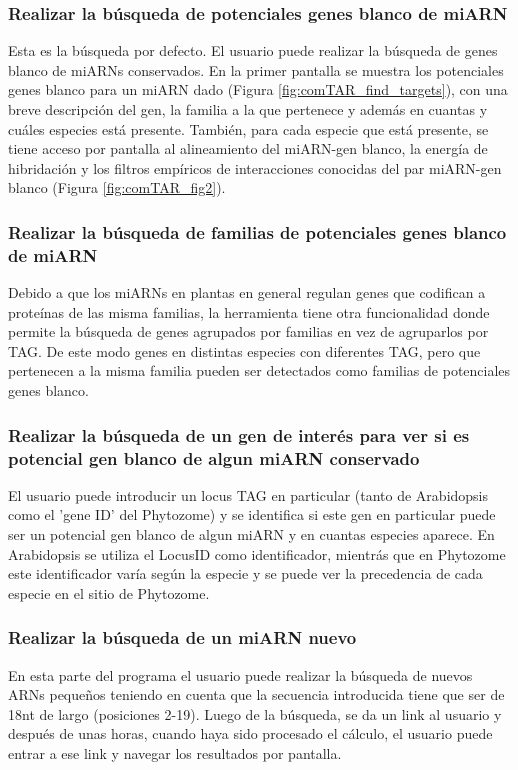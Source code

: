 \subsubsection{Realizar la búsqueda de potenciales genes blanco de miARN}
Esta es la búsqueda por defecto.
El usuario puede realizar la búsqueda de genes blanco de miARNs conservados.
En la primer pantalla se muestra los potenciales genes blanco para un miARN dado (Figura \ref{fig:comTAR_find_targets}), con una breve descripción del gen, la familia a la que pertenece y además en cuantas y cuáles especies está presente.
También, para cada especie que está presente, se tiene acceso por pantalla al alineamiento del miARN-gen blanco, la energía de hibridación y los filtros empíricos de interacciones conocidas del par miARN-gen blanco (Figura \ref{fig:comTAR_fig2}).

\subsubsection{Realizar la búsqueda de familias de potenciales genes blanco de miARN}
Debido a que los miARNs en plantas en general regulan genes que codifican a proteínas de las misma familias, la herramienta tiene otra funcionalidad donde permite la búsqueda de genes agrupados por familias en vez de agruparlos por TAG.
De este modo genes en distintas especies con diferentes TAG, pero que pertenecen a la misma familia pueden ser detectados como familias de potenciales genes blanco.

\subsubsection{Realizar la búsqueda de un gen de interés para ver si es potencial gen blanco de algun miARN conservado}

El usuario puede introducir un locus TAG en particular (tanto de Arabidopsis como el 'gene ID' del Phytozome) y se identifica si este gen en particular puede ser un potencial gen blanco de algun miARN y en cuantas especies aparece.
En Arabidopsis se utiliza el LocusID como identificador, mientrás que en Phytozome este identificador varía según la especie y se puede ver la precedencia de cada especie en el sitio de Phytozome.

\subsubsection{Realizar la búsqueda de un miARN nuevo}
En esta parte del programa el usuario puede realizar la búsqueda de nuevos ARNs pequeños teniendo en cuenta que la secuencia introducida tiene que ser de 18nt de largo (posiciones 2-19).
Luego de la búsqueda, se da un link al usuario y después de unas horas, cuando haya sido procesado el cálculo, el usuario puede entrar a ese link y navegar los resultados por pantalla.




